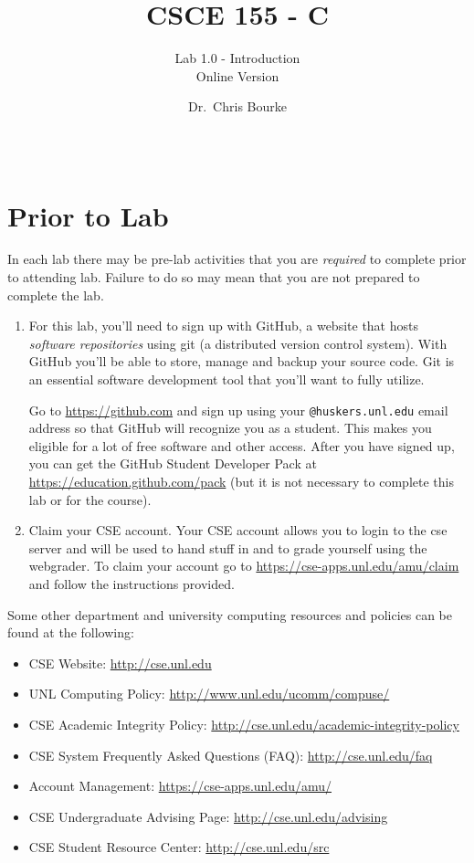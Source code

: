 \documentclass[12pt]{scrartcl}
\title{CSCE 155 - C}
\subtitle{Lab 1.0 - Introduction\\
Online Version}
\author{Dr.\ Chris Bourke}
\date{~}
\begin{document}
\maketitle

\section*{Prior to Lab}

In each lab there may be pre-lab activities that you are 
\emph{required} to complete prior to attending lab.  Failure 
to do so may mean that you are not prepared to complete the
lab.  

\begin{enumerate}
  \item For this lab, you'll need to sign up with GitHub, a website
that hosts \emph{software repositories} using git (a distributed
version control system).  With GitHub you'll be able to store,
manage and backup your source code.  Git is an essential software
development tool that you'll want to fully utilize.  

Go to \url{https://github.com} and sign up using your 
\texttt{@huskers.unl.edu} email address so that GitHub 
will recognize you as a student.  This makes you eligible for
a lot of free software and other access.  After you have signed
up, you can get the GitHub Student Developer Pack at 
\url{https://education.github.com/pack} (but it is not necessary 
to complete this lab or for the course).

\item Claim your CSE account.  Your CSE account allows you to login
to the cse server and will be used to hand stuff in and to grade
yourself using the webgrader.  To claim your account go to 
\url{https://cse-apps.unl.edu/amu/claim} and follow the instructions
provided.  
\end{enumerate}


Some other department and university computing resources
and policies can be found at the following:

\begin{itemize}
  \item CSE Website: \url{http://cse.unl.edu}
  \item UNL Computing Policy: \url{http://www.unl.edu/ucomm/compuse/}
   \item CSE Academic Integrity Policy: \url{http://cse.unl.edu/academic-integrity-policy}
   \item CSE System Frequently Asked Questions (FAQ): \url{http://cse.unl.edu/faq}
   \item Account Management: \url{https://cse-apps.unl.edu/amu/}
   \item CSE Undergraduate Advising Page: \url{http://cse.unl.edu/advising}
   \item CSE Student Resource Center: \url{http://cse.unl.edu/src}
\end{itemize}
\end{document}
